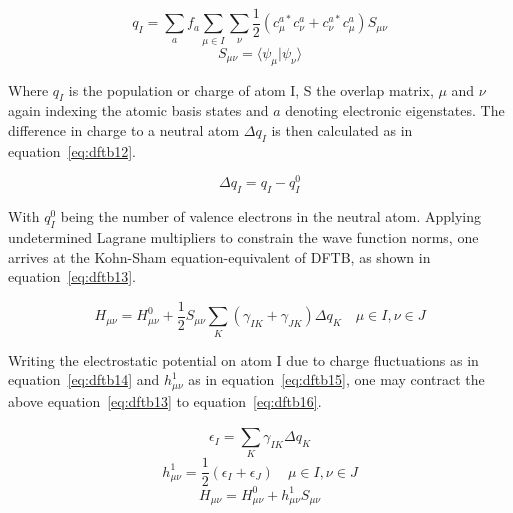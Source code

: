 \documentclass[12pt]{article}
\begin{document}
\begin{equation}
  q_I = \sum_{a}^{}f_a\sum_{\mu \in I}^{}\sum_{\nu}^{}\frac{1}{2}(c_{\mu}^{a*}c_{\nu}^a + c_{\nu}^{a*}c_{\mu}^a)S_{\mu\nu}
  \label{eq:dftb11}
\end{equation}
\begin{equation*}
  S_{\mu\nu} = \langle\psi_{\mu}|\psi_{\nu}\rangle
\end{equation*}

\bigskip

\noindent Where $q_I$ is the population or charge of atom I, S the overlap matrix, $\mu$ and $\nu$ again indexing the atomic basis states and $a$ denoting electronic eigenstates.
The difference in charge to a neutral atom $\Delta q_I$ is then calculated as in equation~\ref{eq:dftb12}.

\begin{equation}
  \Delta q_I = q_I - q_I^{0}
  \label{eq:dftb12}
\end{equation}

\bigskip

\noindent With $q_I^{0}$ being the number of valence electrons in the neutral atom.
Applying undetermined Lagrane multipliers to constrain the wave function norms, one arrives at the Kohn-Sham equation-equivalent of DFTB, as shown in equation~\ref{eq:dftb13}.

\begin{equation}
  H_{\mu\nu} = H_{\mu\nu}^0 + \frac{1}{2}S_{\mu\nu}\sum_{K}^{}(\gamma_{IK} + \gamma_{JK})\Delta q_K  \quad \mu \in I, \nu \in J
  \label{eq:dftb13}
\end{equation}

\bigskip

\noindent Writing the electrostatic potential on atom I due to charge fluctuations as in equation~\ref{eq:dftb14} and $h_{\mu\nu}^1$ as in equation~\ref{eq:dftb15}, one may contract the above equation~\ref{eq:dftb13} to equation~\ref{eq:dftb16}.

\begin{equation}
  \epsilon_I = \sum_{K}^{}\gamma_{IK}\Delta q_K
  \label{eq:dftb14}
\end{equation}
\begin{equation}
  h_{\mu\nu}^1 = \frac{1}{2}(\epsilon_I + \epsilon_J) \quad \mu \in I, \nu \in J
  \label{eq:dftb15}
\end{equation}
\begin{equation}
  H_{\mu\nu} = H_{\mu\nu}^0 + h_{\mu\nu}^1S_{\mu\nu}
  \label{eq:dftb16}
\end{equation}
\end{document}
